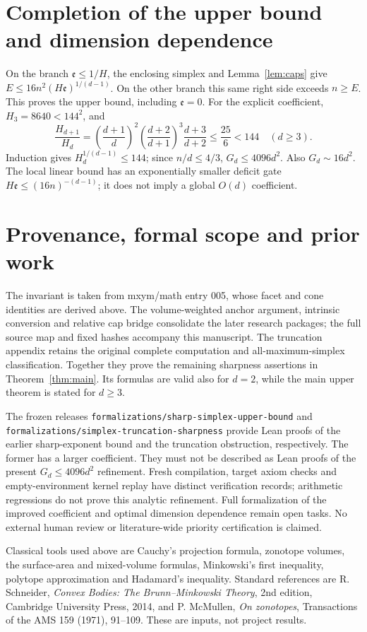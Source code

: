 \documentclass[11pt]{article}
\newcommand{\ee}{\mathfrak e}
\begin{document}
\section{Completion of the upper bound and dimension dependence}
On the branch $\ee\le1/H$, the enclosing simplex and
Lemma~\ref{lem:caps} give $E\le16n^2(H\ee)^{1/(d-1)}$.
On the other branch this same right side exceeds $n\ge E$.
This proves the upper bound, including $\ee=0$.
For the explicit coefficient, $H_3=8640<144^2$, and
\[
\frac{H_{d+1}}{H_d}
=\left(\frac{d+1}{d}\right)^2
 \left(\frac{d+2}{d+1}\right)^3\frac{d+3}{d+2}
\le\frac{25}{6}<144\quad(d\ge3).
\]
Induction gives $H_d^{1/(d-1)}\le144$; since $n/d\le4/3$, $G_d\le4096d^2$.
Also $G_d\sim16d^2$. The local linear bound has an exponentially smaller
deficit gate $H\ee\le(16n)^{-(d-1)}$; it does not imply a global $O(d)$
coefficient.

\appendix


\section{Provenance, formal scope and prior work}
The invariant is taken from mxym/math entry 005, whose facet and cone identities
are derived above. The volume-weighted anchor argument, intrinsic conversion
and relative cap bridge consolidate the later research packages; the full
source map and fixed hashes accompany this manuscript. The truncation appendix
retains the original complete computation and all-maximum-simplex classification.
Together they prove the remaining sharpness assertions in
Theorem~\ref{thm:main}. Its formulas are valid also for $d=2$, while the main
upper theorem is stated for $d\ge3$.

The frozen releases
\nolinkurl{formalizations/sharp-simplex-upper-bound} and
\nolinkurl{formalizations/simplex-truncation-sharpness} provide Lean proofs
of the earlier sharp-exponent bound and the truncation obstruction, respectively.
The former has a larger coefficient. They must not be described as Lean
proofs of the present $G_d\le4096d^2$ refinement. Fresh compilation, target
axiom checks and empty-environment kernel replay have distinct verification
records; arithmetic regressions do not prove this analytic refinement.
Full formalization of the improved coefficient and optimal dimension dependence
remain open tasks. No external human review or literature-wide priority
certification is claimed.

Classical tools used above are Cauchy's projection formula, zonotope volumes,
the surface-area and mixed-volume formulas, Minkowski's first inequality,
polytope approximation and Hadamard's inequality. Standard references are
R. Schneider, \emph{Convex Bodies: The Brunn--Minkowski Theory}, 2nd edition,
Cambridge University Press, 2014, and P. McMullen,
\emph{On zonotopes}, Transactions of the AMS 159 (1971), 91--109.
These are inputs, not project results.
\end{document}
